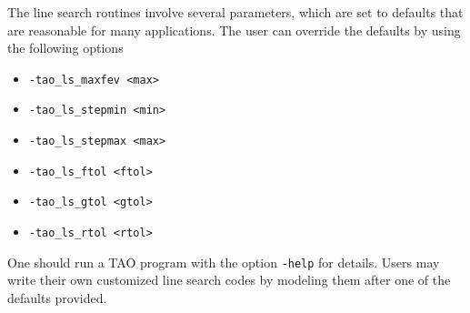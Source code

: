 The line search routines involve several parameters, which are set
to defaults that are reasonable for many applications.  The user
can override the defaults by using the following options
\begin{itemize}
\item {\tt -tao\_ls\_maxfev <max>}
\item {\tt -tao\_ls\_stepmin <min>}
\item {\tt -tao\_ls\_stepmax <max>}
\item {\tt -tao\_ls\_ftol <ftol>}
\item {\tt -tao\_ls\_gtol <gtol>}
\item {\tt -tao\_ls\_rtol <rtol>}
\end{itemize}

One should run a TAO program with the option 
{\tt -help}
for details.  Users may write their own customized line search codes
by modeling them after one of the defaults provided.


